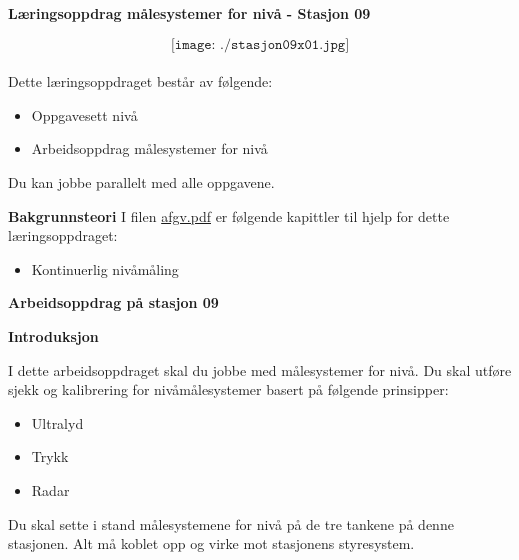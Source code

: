

\vskip 5pt

\vskip 5pt
\begin{center}
	\huge
	\textbf{Læringsoppdrag målesystemer for nivå - Stasjon 09}
	\normalsize
\vskip 5pt 
\end{center}

$$\texttt{[image: ./stasjon09x01.jpg]}$$\\

\vskip 1cm
Dette læringsoppdraget består av følgende:

\begin{itemize}[noitemsep]
	\item Oppgavesett nivå
	\item Arbeidsoppdrag målesystemer for nivå
\end{itemize}


 
\vskip 5pt 

Du kan jobbe parallelt med alle oppgavene. 

\vskip 5pt 
\textbf{Bakgrunnsteori}
 I filen \href {https://autofaget.no/pdfs/afgv.pdf}{afgv.pdf} er følgende kapittler til hjelp for dette læringsoppdraget:
 \begin{itemize}[noitemsep]
	 \item Kontinuerlig nivåmåling 
 \end{itemize}
\newpage
\textbf{Arbeidsoppdrag på stasjon 09}

\vskip 1cm

\textbf{Introduksjon}

I dette arbeidsoppdraget skal du jobbe med målesystemer for nivå. Du skal utføre sjekk og kalibrering for nivåmålesystemer basert på følgende prinsipper:
\begin{itemize}[noitemsep]
	\item Ultralyd
	\item Trykk
	\item Radar
\end{itemize}
Du skal sette i stand målesystemene for nivå på de tre tankene på denne stasjonen. Alt må koblet opp og virke mot stasjonens styresystem. 


\vskip 5pt 

